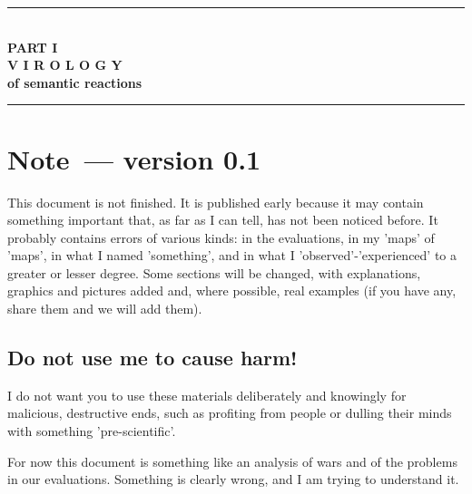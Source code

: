 \documentclass[13pt,a4paper]{article}
\newcommand{\kav}[1]{\textcolor{sce-red}{'#1'}}
\begin{document}
\newpage
\tableofcontents
\newpage


\newpage
\begin{center}
\vspace*{1cm}
\textcolor{sce-gold}{\rule{0.5\textwidth}{0.4pt}}\\[0.8em]
{\montserrat\Large\bfseries{}\color{sce-black}
PART I}\\[0.4em]
{\montserrat\large\bfseries{}\color{sce-grey}
V I R O L O G Y}\\[0.2em]
{\montserrat\normalsize\bfseries{}\color{sce-grey}
of semantic reactions}\\[0.8em]
\textcolor{sce-gold}{\rule{0.5\textwidth}{0.4pt}}
\vspace{1cm}
\end{center}

\section{Note~--- version 0.1}

This document is not finished. It is published early because it may contain something
important that, as far as I can tell, has not been noticed before. It probably contains
errors of various kinds: in the evaluations, in my \kav{maps} of \kav{maps}, in what I
named \kav{something}, and in what I \kav{observed}-\kav{experienced} to a greater or lesser
degree. Some sections will be changed, with explanations, graphics and pictures added and,
where possible, real examples (if you have any, share them and we will add them).

\subsection{Do not use me to cause harm!}

I do not want you to use these materials deliberately and knowingly for malicious,
destructive ends, such as profiting from people or dulling their minds with something
\kav{pre-scientific}.

For now this document is something like an analysis of wars and of the problems in our
evaluations. Something is clearly wrong, and I am trying to understand it.
\end{document}
